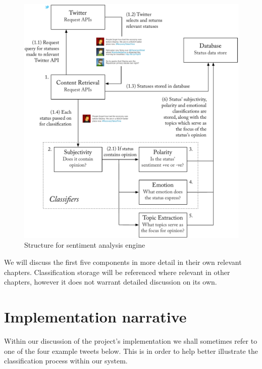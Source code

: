 \begin{figure}
	\caption{Structure for sentiment analysis engine}
	\label{fig:outline_diagram}
	\centering
		\includegraphics[width=1\textwidth]{figures/outline.pdf}
\end{figure}

We will discuss the first five components in more detail in their own relevant chapters. Classification storage will be referenced where relevant in other chapters, however it does not warrant detailed discussion on its own. 

\section{Implementation narrative}

Within our discussion of the project's implementation we shall sometimes refer to one of the four example tweets below. This is in order to help better illustrate the classification process within our system. 

